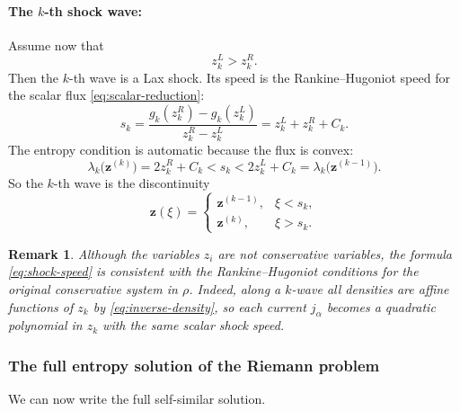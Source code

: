 \documentclass[12pt]{article}
\newtheorem{remark}[theorem]{Remark}
\begin{document}
\paragraph{The $k$-th shock wave:}Assume now that
\[
z_k^L>z_k^R.
\]
Then the $k$-th wave is a Lax shock. Its speed is the Rankine--Hugoniot speed for the scalar flux \eqref{eq:scalar-reduction}:
\begin{equation}
s_k
=
\frac{g_k(z_k^R)-g_k(z_k^L)}{z_k^R-z_k^L}
=
z_k^L+z_k^R+C_k.
\label{eq:shock-speed}
\end{equation}
The entropy condition is automatic because the flux is convex:
\[
\lambda_k\bigl(\mathbf{z}^{(k)}\bigr)=2z_k^R+C_k
< s_k <
2z_k^L+C_k=\lambda_k\bigl(\mathbf{z}^{(k-1)}\bigr).
\]
So the $k$-th wave is the discontinuity
\begin{equation}
\mathbf{z}(\xi)=
\begin{cases}
\mathbf{z}^{(k-1)},& \xi<s_k,\\
\mathbf{z}^{(k)},& \xi>s_k.
\end{cases}
\label{eq:shock-profile}
\end{equation}

\begin{remark}
Although the variables $z_i$ are not conservative variables, the formula \eqref{eq:shock-speed} is consistent with the Rankine--Hugoniot conditions for the original conservative system in $\rho$. Indeed, along a $k$-wave all densities are affine functions of $z_k$ by \eqref{eq:inverse-density}, so each current $j_\alpha$ becomes a quadratic polynomial in $z_k$ with the same scalar shock speed.
\end{remark}

\subsubsection*{The full entropy solution of the Riemann problem}

We can now write the full self-similar solution.
\end{document}
